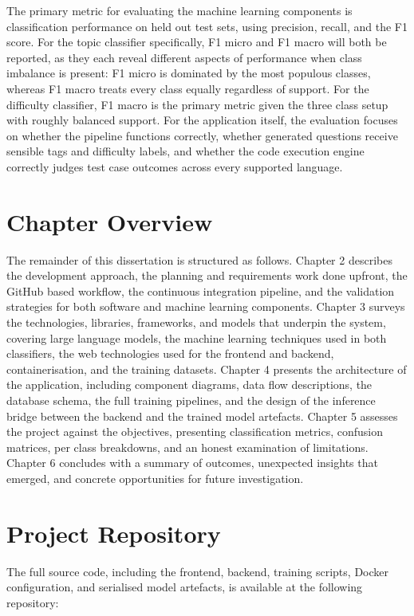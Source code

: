 The primary metric for evaluating the machine learning components is
classification performance on held out test sets, using precision, recall, and the F1 score. For the topic classifier specifically, F1 micro and F1 macro will both be reported, as they each reveal different aspects of performance when class imbalance is present: F1 micro is dominated by the most populous classes, whereas F1 macro treats every class equally regardless of support. For the difficulty classifier, F1 macro is the primary metric given the three class setup with roughly balanced support. For the application itself, the evaluation focuses on whether the pipeline functions correctly, whether generated questions receive sensible tags and difficulty labels, and whether the code execution engine correctly judges test case outcomes across every supported language.

\section{Chapter Overview}

The remainder of this dissertation is structured as follows. Chapter
2 describes the development approach, the planning and requirements
work done upfront, the GitHub based workflow, the continuous
integration pipeline, and the validation strategies for both software
and machine learning components. Chapter 3 surveys the technologies,
libraries, frameworks, and models that underpin the system, covering
large language models, the machine learning techniques used in both
classifiers, the web technologies used for the frontend and backend,
containerisation, and the training datasets. Chapter 4 presents the
architecture of the application, including component diagrams, data
flow descriptions, the database schema, the full training pipelines,
and the design of the inference bridge between the backend and the
trained model artefacts. Chapter 5 assesses the project against the
objectives, presenting classification metrics, confusion matrices, per
class breakdowns, and an honest examination of limitations. Chapter 6
concludes with a summary of outcomes, unexpected insights that
emerged, and concrete opportunities for future investigation.

\section{Project Repository}

The full source code, including the frontend, backend, training
scripts, Docker configuration, and serialised model artefacts, is
available at the following repository:

